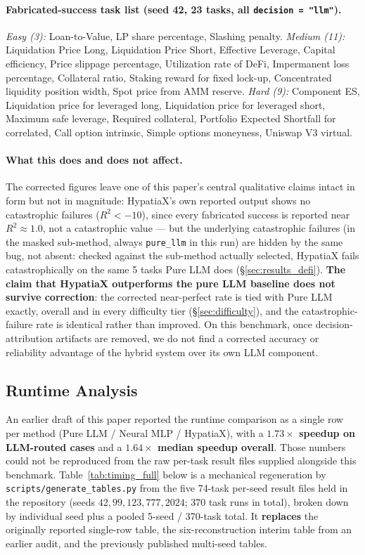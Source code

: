 \documentclass[twoside,11pt]{article}
\newcommand{\Rsq}{R^{2}}
\begin{document}
\paragraph{Fabricated-success task list (seed 42, 23 tasks, all
\texttt{decision = "llm"}).} \emph{Easy (3):} Loan-to-Value, LP share
percentage, Slashing penalty.
\emph{Medium (11):} Liquidation Price Long, Liquidation Price Short,
Effective Leverage, Capital efficiency, Price slippage percentage,
Utilization rate of DeFi, Impermanent loss percentage, Collateral ratio,
Staking reward for fixed lock-up, Concentrated liquidity position width,
Spot price from AMM reserve.
\emph{Hard (9):} Component ES, Liquidation price for leveraged long,
Liquidation price for leveraged short, Maximum safe leverage, Required
collateral, Portfolio Expected Shortfall for correlated, Call option
intrinsic, Simple options moneyness, Uniswap V3 virtual.

\paragraph{What this does and does not affect.} The corrected figures leave
one of this paper's central qualitative claims intact in form but not in
magnitude: HypatiaX's own reported output shows no catastrophic failures
($\Rsq < -10$), since every fabricated success is reported near
$\Rsq \approx 1.0$, not a catastrophic value --- but the underlying
catastrophic failures (in the masked sub-method, always \texttt{pure\_llm}
in this run) are hidden by the same bug, not absent: checked against the
sub-method actually selected, HypatiaX fails catastrophically on the same
5 tasks Pure LLM does (\S\ref{sec:results_defi}). \textbf{The claim that
HypatiaX outperforms the pure LLM baseline does not survive correction}:
the corrected near-perfect rate is tied with Pure LLM exactly, overall
and in every difficulty tier (\S\ref{sec:difficulty}), and the
catastrophic-failure rate is identical rather than improved. On this
benchmark, once decision-attribution artifacts are removed, we do not
find a corrected accuracy or reliability advantage of the hybrid system
over its own LLM component.

\subsection{Runtime Analysis}\label{subsec:runtime-analysis}
\label{sec:timing}

An earlier draft of this paper reported the runtime comparison as a single
row per method (Pure LLM / Neural MLP / HypatiaX), with a
\textbf{$1.73\times$ speedup on LLM-routed cases} and a
\textbf{$1.64\times$ median speedup overall}. Those numbers could not be
reproduced from the raw per-task result files supplied alongside this
benchmark. Table~\ref{tab:timing_full} below is a mechanical regeneration
by \texttt{scripts/generate\_tables.py} from the five 74-task per-seed result
files held in the repository (seeds $42, 99, 123, 777, 2024$; $370$ task runs
in total), broken down by individual seed plus a pooled 5-seed / 370-task
total. It \textbf{replaces} the originally reported single-row table, the
six-reconstruction interim table from an earlier audit, and the previously
published multi-seed tables.
\end{document}
